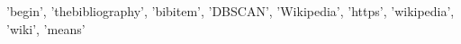 {'begin', 'thebibliography', 'bibitem', 'DBSCAN', 'Wikipedia', 'https', 'wikipedia', 'wiki', 'means'}
